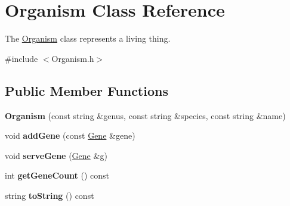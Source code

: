 \hypertarget{class_organism}{}\section{Organism Class Reference}
\label{class_organism}


The \hyperlink{class_organism}{Organism} class represents a living thing.  




{\ttfamily \#include $<$Organism.\+h$>$}

\subsection*{Public Member Functions}
\begin{DoxyCompactItemize}
\item 
{\bfseries Organism} (const string \&genus, const string \&species, const string \&name)\hypertarget{class_organism_a4e5d98843608364964a6616e630f9c3b}{}\label{class_organism_a4e5d98843608364964a6616e630f9c3b}

\item 
void {\bfseries add\+Gene} (const \hyperlink{class_gene}{Gene} \&gene)\hypertarget{class_organism_a3dd60a8f90366cd02ba10e32bc2aae3c}{}\label{class_organism_a3dd60a8f90366cd02ba10e32bc2aae3c}

\item 
void {\bfseries serve\+Gene} (\hyperlink{class_gene}{Gene} \&g)\hypertarget{class_organism_ab724ebf5bcdf179f76225730f9f85c7c}{}\label{class_organism_ab724ebf5bcdf179f76225730f9f85c7c}

\item 
int {\bfseries get\+Gene\+Count} () const \hypertarget{class_organism_a9719a5a125a051c2fadffe6f4d9a8bb8}{}\label{class_organism_a9719a5a125a051c2fadffe6f4d9a8bb8}

\item 
string {\bfseries to\+String} () const \hypertarget{class_organism_ace0beff5bf214f048ef5d745e45085e0}{}\label{class_organism_ace0beff5bf214f048ef5d745e45085e0}


\end{DoxyCompactItemize}
